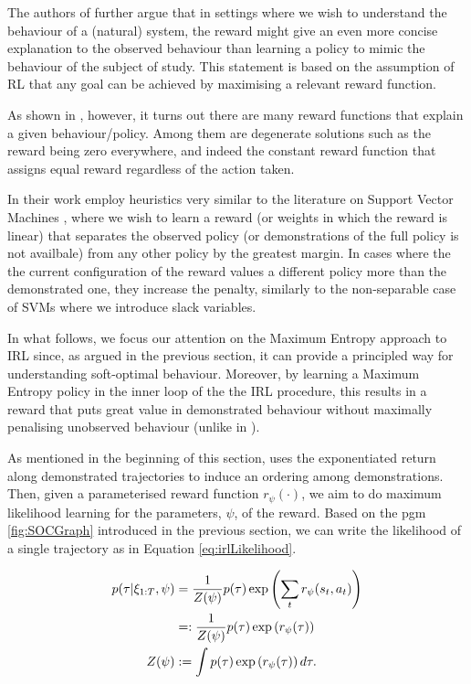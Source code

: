 \documentclass{report}
\numberwithin{equation}{section}
\numberwithin{figure}{section}
\numberwithin{table}{section}
\numberwithin{algorithm}{section}
\begin{document}
The authors of \cite{NgIRL} 
further argue that in settings where we wish to understand 
the behaviour of a (natural) system, the reward might give an even 
more concise explanation to the observed behaviour 
than learning a policy to mimic the behaviour of the subject 
of study. This statement is based on the assumption 
of RL that any goal can be achieved by maximising a relevant reward 
function.

As shown in \cite{NgIRL}, however, it turns out there are many 
reward functions that explain a given behaviour/policy. Among 
them are degenerate solutions such as the 
reward being zero everywhere, 
and indeed the constant reward function that assigns equal reward 
regardless of the action taken.

In their work \cite{NgIRL} employ heuristics very similar to the 
literature on Support Vector Machines \citep{SVMs}, where we 
wish to learn a reward (or weights in which the reward is linear) 
that separates the observed policy (or demonstrations of 
the full policy is not availbale) from any other policy by the 
greatest margin. In cases where the the current configuration 
of the reward values a different policy more than the demonstrated 
one, they increase the penalty, similarly to the non-separable 
case of SVMs where we introduce slack variables.

In what follows, we focus our attention on the Maximum Entropy 
approach to IRL \citep{Ziebart2008} since, 
as argued in the previous section, it can provide a principled 
way for understanding soft-optimal behaviour. 
Moreover, by learning a Maximum Entropy policy in the 
inner loop of the the IRL procedure, this results in a reward 
that puts great value in demonstrated behaviour without 
maximally penalising unobserved behaviour (unlike 
in \cite{NgIRL}).

As mentioned in the beginning of this section, \cite{Ziebart2008} 
uses the exponentiated return along demonstrated trajectories 
to induce an ordering among demonstrations. Then, given 
a parameterised reward function $r_\psi(\cdot)$, 
we aim to do maximum likelihood learning for the 
parameters, $\psi$, of the reward. Based on the pgm 
\ref{fig:SOCGraph} introduced in the previous section, we can 
write the likelihood of a single trajectory 
as in Equation \ref{eq:irlLikelihood}.

\begin{align}\label{eq:irlLikelihood}
  p(\tau|\xi_{1:T},\psi)&=\frac{1}{Z(\psi)}p(\tau)\exp\left(\sum_{t}r_\psi(s_t,a_t)\right)\notag\\
  &=:\frac{1}{Z(\psi)}p(\tau)\exp\left(r_\psi(\tau)\right)\notag\\
  Z(\psi)&:=\int p(\tau)\exp\left(
    r_\psi (\tau)
  \right)d\tau.
\end{align}
\end{document}
